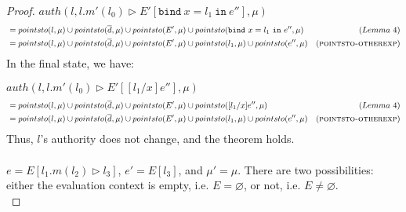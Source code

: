 \documentclass{llncs}
\newcommand{\keywadj}[1]{\mathtt{#1}}
\newcommand{\keyw}[1]{\keywadj{#1}~}
\begin{document}
\begin{proof}
\noindent$auth(l, l.m'(l_0) \rhd E'[\keyw{bind} x = l_1~\keyw{in} e''], \mu)$
\vspace{-7pt}
\begin{align*}
&= pointsto(l, \mu) \cup pointsto(\overline{d}, \mu) \cup pointsto(E', \mu) \cup pointsto(\keyw{bind} x = l_1~\keyw{in} e'', \mu) & (Lemma~4)\\
&= pointsto(l, \mu) \cup pointsto(\overline{d}, \mu) \cup pointsto(E', \mu) \cup pointsto(l_1, \mu) \cup pointsto(e'', \mu) & (\textsc{pointsto-otherexp})
\end{align*}
In the final state, we have:

\noindent$auth(l, l.m'(l_0) \rhd E'[[l_1/x] e''], \mu)$
\vspace{-7pt}
\begin{align*}
&= pointsto(l, \mu) \cup pointsto(\overline{d}, \mu) \cup pointsto(E', \mu) \cup pointsto([l_1/x] e'', \mu) & (Lemma~4)\\
&= pointsto(l, \mu) \cup pointsto(\overline{d}, \mu) \cup pointsto(E', \mu) \cup pointsto(l_1, \mu) \cup pointsto(e'', \mu) & (\textsc{pointsto-otherexp})
\end{align*}
Thus, $l$'s authority does not change, and the theorem holds.\\\\


\noindent{}
$e = E[l_1.m(l_2) \rhd l_3]$, $e' = E[l_3]$, and $\mu' = \mu$. There are two possibilities: either the evaluation context is empty, i.e. $E = \varnothing$, or not, i.e. $E \not= \varnothing$.\\


\end{proof}
\end{document}
